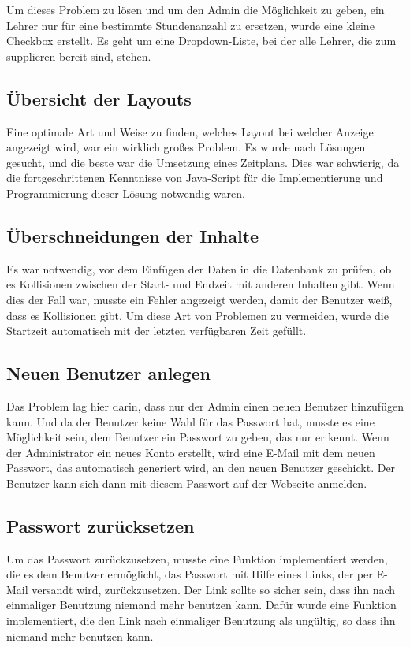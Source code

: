 Um dieses Problem zu lösen und um den Admin die Möglichkeit zu geben, ein Lehrer nur für eine bestimmte Stundenanzahl zu ersetzen, wurde eine kleine Checkbox erstellt. Es geht um eine Dropdown-Liste, bei der alle Lehrer, die zum supplieren bereit sind, stehen. 

\subsection{Übersicht der Layouts}

Eine optimale Art und Weise zu finden, welches Layout bei welcher Anzeige angezeigt wird, war ein wirklich großes Problem. Es wurde nach Lösungen gesucht, und die beste war die Umsetzung eines Zeitplans. Dies war schwierig, da die fortgeschrittenen Kenntnisse von Java-Script für die Implementierung und Programmierung dieser Lösung notwendig waren. 

\subsection{Überschneidungen der Inhalte}

Es war notwendig, vor dem Einfügen der Daten in die Datenbank zu prüfen, ob es Kollisionen zwischen der Start- und Endzeit mit anderen Inhalten gibt. Wenn dies der Fall war, musste ein Fehler angezeigt werden, damit der Benutzer weiß, dass es Kollisionen gibt. Um diese Art von Problemen zu vermeiden, wurde die Startzeit automatisch mit der letzten verfügbaren Zeit gefüllt.


\subsection{Neuen Benutzer anlegen}

Das Problem lag hier darin, dass nur der Admin einen neuen Benutzer hinzufügen kann.  Und da der Benutzer keine Wahl für das Passwort hat, musste es eine Möglichkeit sein, dem Benutzer ein Passwort zu geben, das nur er kennt. Wenn der Administrator ein neues Konto erstellt, wird eine E-Mail mit dem neuen Passwort, das automatisch generiert wird, an den neuen Benutzer geschickt. Der Benutzer kann sich dann mit diesem Passwort auf der Webseite anmelden. 

\subsection{Passwort zurücksetzen}

Um das Passwort zurückzusetzen, musste eine Funktion implementiert werden, die es dem Benutzer ermöglicht, das Passwort mit Hilfe eines Links, der per E-Mail versandt wird, zurückzusetzen. Der Link sollte so sicher sein, dass ihn nach einmaliger Benutzung niemand mehr benutzen kann. Dafür wurde eine Funktion implementiert, die den Link nach einmaliger Benutzung als ung\"ultig, so dass ihn niemand mehr benutzen kann.

